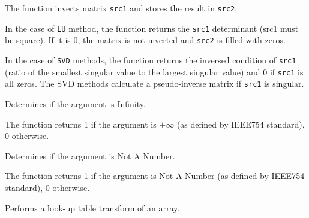 The function inverts matrix \texttt{src1} and stores the result in \texttt{src2}.

In the case of \texttt{LU} method, the function returns the \texttt{src1} determinant (src1 must be square). If it is 0, the matrix is not inverted and \texttt{src2} is filled with zeros.

In the case of \texttt{SVD} methods, the function returns the inversed condition of \texttt{src1} (ratio of the smallest singular value to the largest singular value) and 0 if \texttt{src1} is all zeros. The SVD methods calculate a pseudo-inverse matrix if \texttt{src1} is singular.


Determines if the argument is Infinity.


\begin{description}
\end{description}

The function returns 1 if the argument is $\pm \infty $ (as defined by IEEE754 standard), 0 otherwise.

Determines if the argument is Not A Number.


\begin{description}
\end{description}

The function returns 1 if the argument is Not A Number (as defined by IEEE754 standard), 0 otherwise.


Performs a look-up table transform of an array.


\begin{description}
\end{description}

